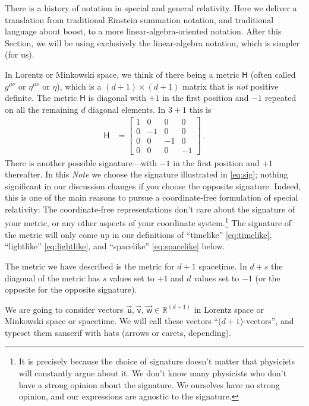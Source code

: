 \documentclass{article}
\newcommand{\metric}{\mathsf{H}}
\newcommand\upvec[1]{\!\vec{\,\mathrm{#1}}}
\newcommand{\Lvec}[1]{\upvec{\mathsf{#1}}} %
\newcommand{\plus}{\!+\!} %
\newcommand{\documentname}{\textsl{Note}}
\begin{document}
There is a history of notation in special and general relativity.
Here we deliver a translation from traditional Einstein summation notation, and traditional language about boost, to a more linear-algebra-oriented notation.
After this Section, we will be using exclusively the linear-algebra notation, which is simpler (for us).

In Lorentz or Minkowski space, we think of there being a metric $\metric$ (often called $g^{\mu\nu}$ or $\eta^{\mu\nu}$ or $\eta$), which is a $(d\plus1)\times(d\plus1)$ matrix that is \emph{not} positive definite.
The metric $\metric$ is diagonal with $+1$ in the first position and $-1$ repeated on all the remaining $d$ diagonal elements.
In $3\plus1$ this is
\begin{align}\label{eq:sig}
    \metric &= \begin{bmatrix}1 & 0 & 0 & 0\\
                              0 & -1 & 0 & 0\\
                              0 & 0 & -1 & 0\\
                              0 & 0 & 0 & -1\end{bmatrix} ~.
\end{align}
There is another possible signature---with $-1$ in the first position and $+1$ thereafter.
In this \documentname{} we choose the signature illustrated in \eqref{eq:sig}; nothing significant in our discussion changes if you choose the opposite signature.
Indeed, this is one of the main reasons to pursue a coordinate-free formulation of special relativity:
The coordinate-free representations don't care about the signature of your metric, or any other aspects of your coordinate system.\footnote{It is precisely because the choice of signature doesn't matter that physicists will constantly argue about it. We don't know many physicists who don't have a strong opinion about the signature. We ourselves have no strong opinion, and our expressions are agnostic to the signature.}
The signature of the metric will only come up in our definitions of ``timelike'' \eqref{eq:timelike}, ``lightlike'' \eqref{eq:lightlike}, and ``spacelike'' \eqref{eq:spacelike} below.

The metric we have described is the metric for $d\plus 1$ spacetime.
In $d\plus s$ the diagonal of the metric has $s$ values set to $+1$ and $d$ values set to $-1$ (or the opposite for the opposite signature).

We are going to consider vectors $\Lvec{u}, \Lvec{v}, \Lvec{w}\in\mathbb{R}^{(d+1)}$ in Lorentz space or Minkowski space or spacetime.
We will call these vectors ``($d\plus1$)-vectors'', and typeset them sanserif with hats (arrows or carets, depending).
\end{document}

